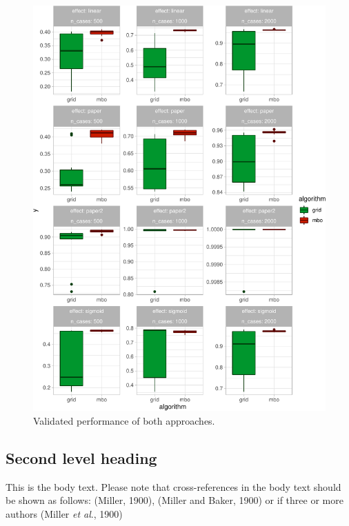 \documentclass[bimj,fleqn]{w-art}
\theoremstyle{plain}
\theoremstyle{definition}
\begin{document}
\begin{figure}[htb]
\begin{center}
\includegraphics[width=\linewidth]{generated/figures/plot_boxplot_valid_y.pdf}
\caption{%
  Validated performance of both approaches.
  }
\end{center}
\end{figure}





\subsection{Second level heading}

This is the body text. Please note that cross-references in the body text should be shown as follows:
(Miller, 1900), (Miller and Baker, 1900) or if three or more authors (Miller {\it{et al}}., 1900)
\vspace*{12pt}
\end{document}
